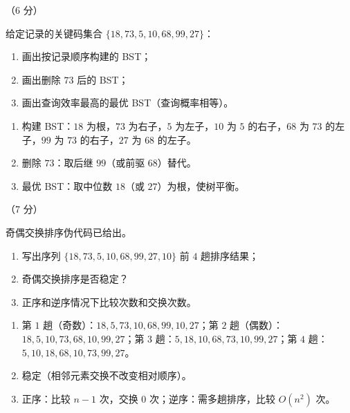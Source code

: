 \begin{question}[BST 操作]（6 分）

给定记录的关键码集合 $\{18,73,5,10,68,99,27\}$：
\begin{enumerate}[label=(\arabic*)]
  \item 画出按记录顺序构建的 BST；
  \item 画出删除 $73$ 后的 BST；
  \item 画出查询效率最高的最优 BST（查询概率相等）。
\end{enumerate}

\begin{solution}
\begin{enumerate}[label=(\arabic*)]
  \item 构建 BST：$18$ 为根，$73$ 为右子，$5$ 为左子，$10$ 为 $5$ 的右子，$68$ 为 $73$ 的左子，$99$ 为 $73$ 的右子，$27$ 为 $68$ 的左子。
  \item 删除 $73$：取后继 $99$（或前驱 $68$）替代。
  \item 最优 BST：取中位数 $18$（或 $27$）为根，使树平衡。
\end{enumerate}
\end{solution}
\end{question}

\begin{question}[奇偶交换排序]（7 分）

奇偶交换排序伪代码已给出。
\begin{enumerate}
  \item 写出序列 $\{18,73,5,10,68,99,27,10\}$ 前 $4$ 趟排序结果；
  \item 奇偶交换排序是否稳定？
  \item 正序和逆序情况下比较次数和交换次数。
\end{enumerate}

\begin{solution}
\begin{enumerate}
  \item 第 $1$ 趟（奇数）：$18,5,73,10,68,99,10,27$；第 $2$ 趟（偶数）：$18,5,10,73,68,10,99,27$；第 $3$ 趟：$5,18,10,68,73,10,99,27$；第 $4$ 趟：$5,10,18,68,10,73,99,27$。
  \item 稳定（相邻元素交换不改变相对顺序）。
  \item 正序：比较 $n-1$ 次，交换 $0$ 次；逆序：需多趟排序，比较 $O(n^2)$ 次。
\end{enumerate}
\end{solution}
\end{question}

\clearpage

